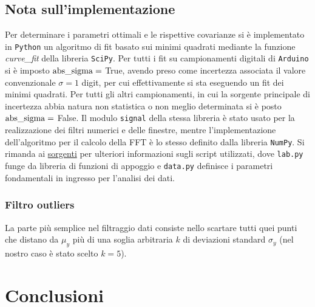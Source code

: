 \documentclass{article}[a4paper, oneside, 11pt]
\begin{document}
\subsection{Nota sull'implementazione}
Per determinare i parametri ottimali e le rispettive covarianze si \`e
implementato in \verb+Python+ un algoritmo di fit basato sui minimi quadrati
mediante la funzione \emph{curve\_fit} della libreria 
\texttt{SciPy}\cite{scipy}.
Per tutti i fit su campionamenti digitali di \verb+Arduino+ si \`e imposto
$\rm{abs\_sigma} =$ True, avendo preso come incertezza associata il valore
convenzionale $\sigma = 1$ digit, per cui effettivamente si sta eseguendo
un fit dei minimi quadrati. Per tutti gli altri campionamenti, in cui la
sorgente principale di incertezza abbia natura non statistica o non meglio
determinata si è posto $\rm{abs\_sigma} =$ False. 
Il modulo \texttt{signal} della stessa libreria è stato usato per
la realizzazione dei filtri numerici e delle finestre, mentre
l'implementazione dell'algoritmo per il calcolo della FFT è lo stesso
definito dalla libreria \texttt{NumPy}\cite{numpy}.
Si rimanda ai
\href{https://github.com/BernardoTomelleri/FFT/tree/master}{sorgenti}
per ulteriori informazioni sugli script utilizzati, dove \verb+lab.py+ funge
da libreria di funzioni di appoggio e \verb+data.py+ definisce i parametri
fondamentali in ingresso per l'analisi dei dati.
\subsubsection{Filtro outliers}
La parte pi\`u semplice nel filtraggio dati consiste nello scartare tutti quei
punti che distano da $\mu_y$ pi\`u di una soglia arbitraria $k$ di deviazioni
standard $\sigma_y$ (nel nostro caso \`e stato scelto $k = 5$).
\section{Conclusioni}

\medskip


\end{document}
